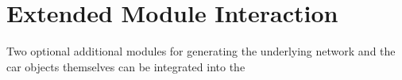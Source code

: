 \section{Extended Module Interaction}

Two optional additional modules for generating the underlying network and the car objects themselves can be integrated into the 




